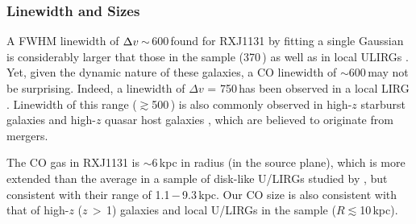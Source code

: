 \documentclass[]{emulateapj}
\begin{document}
\subsubsection{Linewidth and Sizes} \label{sec:sizes}
A FWHM linewidth of $\Delta v_{\rm}$\,$\sim$\,600\,\kms found
for RXJ1131 by fitting a single Gaussian
is considerably larger that those in the  sample
(370\,\kms) as well as in
local ULIRGs \citep[300\,\kms, with the largest being 480\,\kms;][hereafter S97]{Solomon97a}.
Yet, given the dynamic nature of these galaxies,
a CO linewidth of $\sim$600\,\kms may not be surprising.
Indeed, a linewidth of $\Delta v$ = 750\,\kms has been observed
in a local LIRG \citep[Arp 118; ][hereafter SV05]{SV05a}.
Linewidth of this range ($\gtrsim$500\,\kms) is also commonly observed in 
high-$z$ starburst galaxies  \citep[\eg][hereafter G05]{Greve05a} 
and high-$z$ quasar host galaxies \citep[\eg][]{Coppin08a},
which are 
believed to originate from mergers.

The CO gas in RXJ1131 is $\sim$6\,kpc in radius (in the source plane),
which is more
extended than the average in a sample of disk-like U/LIRGs studied by
\citet[]{Ueda14a}, %
but consistent with their range of 1.1\,$-$\,9.3\,kpc.
Our CO size is also consistent with that of high-$z$ 
($z$\,$>$\,1) galaxies \citep[$R\sim$\,4$-$20\,kpc;
;][]{Daddi10a, Riechers11a, Ivison11a} and
local U/LIRGs in the \citet{Gao99a} sample ($R\lesssim$10\,kpc).
\end{document}
